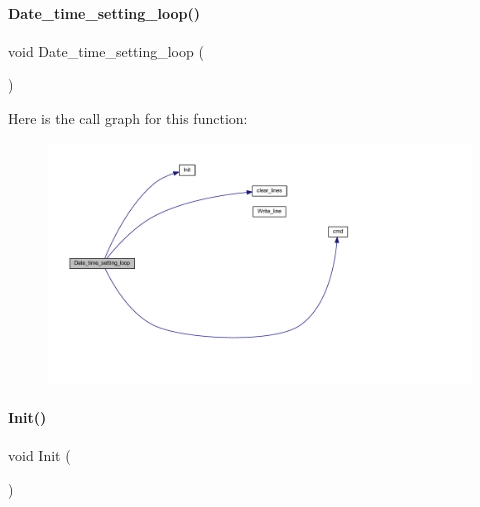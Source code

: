 \paragraph{Date\+\_\+time\+\_\+setting\+\_\+loop()}
{\footnotesize\ttfamily void Date\+\_\+time\+\_\+setting\+\_\+loop (\begin{DoxyParamCaption}{ }\end{DoxyParamCaption})}

Here is the call graph for this function\+:
\nopagebreak
\begin{figure}[H]
\begin{center}
\leavevmode
\includegraphics[width=350pt]{a00026_a9dc57df410d5474edcc75f449aa0b960_cgraph}
\end{center}
\end{figure}
\mbox{\label{a00026_a1e3b6d38df0786ccf7f938d60e386aae}} 
\paragraph{Init()}
{\footnotesize\ttfamily void Init (\begin{DoxyParamCaption}{ }\end{DoxyParamCaption})}

